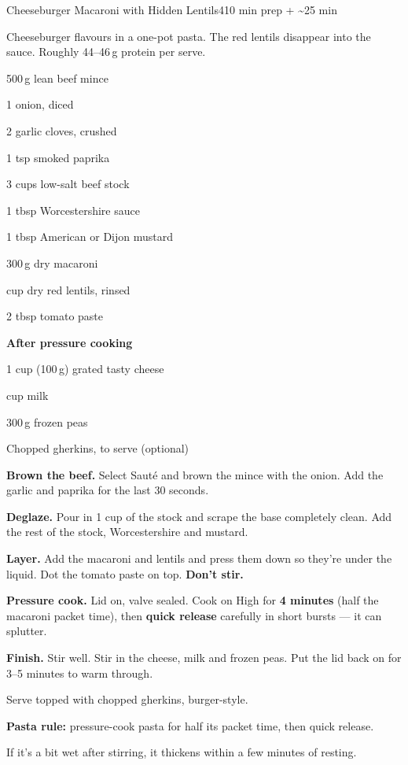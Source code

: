 \begin{recipebox}{Cheeseburger Macaroni with Hidden Lentils}{4}{10 min prep + \textasciitilde25 min}

Cheeseburger flavours in a one-pot pasta. The red lentils disappear into the
sauce. Roughly 44--46\,g protein per serve.

\begin{ingredients}
  \item 500\,g lean beef mince
  \item 1 onion, diced
  \item 2 garlic cloves, crushed
  \item 1 tsp smoked paprika
  \item 3 cups low-salt beef stock
  \item 1 tbsp Worcestershire sauce
  \item 1 tbsp American or Dijon mustard
  \item 300\,g dry macaroni
  \item {} cup dry red lentils, rinsed
  \item 2 tbsp tomato paste
  \item[] \textbf{After pressure cooking}
  \item 1 cup (100\,g) grated tasty cheese
  \item {} cup milk
  \item 300\,g frozen peas
  \item Chopped gherkins, to serve (optional)
\end{ingredients}

\begin{method}
  \item \textbf{Brown the beef.} Select Saut\'e and brown the mince with the onion. Add the garlic and paprika for the last 30 seconds.
  \item \textbf{Deglaze.} Pour in 1 cup of the stock and scrape the base completely clean. Add the rest of the stock, Worcestershire and mustard.
  \item \textbf{Layer.} Add the macaroni and lentils and press them down so they're under the liquid. Dot the tomato paste on top. \textbf{Don't stir.}
  \item \textbf{Pressure cook.} Lid on, valve sealed. Cook on High for \textbf{4 minutes} (half the macaroni packet time), then \textbf{quick release} carefully in short bursts --- it can splutter.
  \item \textbf{Finish.} Stir well. Stir in the cheese, milk and frozen peas. Put the lid back on for 3--5 minutes to warm through.
  \item Serve topped with chopped gherkins, burger-style.
\end{method}

\begin{notelist}
  \item \textbf{Pasta rule:} pressure-cook pasta for half its packet time, then quick release.
  \item If it's a bit wet after stirring, it thickens within a few minutes of resting.
\end{notelist}

\end{recipebox}
